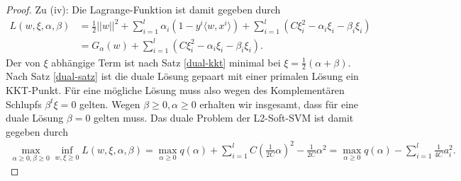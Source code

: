 \begin{proof}
Zu (iv): Die Lagrange-Funktion ist damit gegeben durch
$$
\begin{aligned}
L(w,\xi,\alpha,\beta) &= \frac{1}{2}||w||^2+\sum_{i=1}^l \alpha_i(1-y^i \langle w, x^i \rangle ) + \sum_{i= 1}^l \left(C \xi_i^2 - \alpha_i \xi_i - \beta_i \xi_i \right) \\
&= G_\alpha(w) + \sum_{i= 1}^l \left(C \xi_i^2 - \alpha_i \xi_i - \beta_i \xi_i \right).
\end{aligned}
$$
Der von $\xi$ abhängige Term ist nach Satz \ref{dual-kkt} minimal bei $\xi = \tfrac{1}{2}(\alpha + \beta)$. Nach Satz \ref{dual-satz} ist die duale Lösung gepaart mit einer primalen Lösung ein KKT-Punkt. Für eine mögliche Lösung muss also wegen des Komplementären Schlupfs $\beta^t \xi = 0$ gelten. Wegen $\beta \geq 0, \alpha \geq 0$ erhalten wir insgesamt, dass für eine duale Lösung $\beta  = 0$ gelten muss. Das duale Problem der L2-Soft-SVM ist damit gegeben durch
$$
\begin{aligned}
\max_{\alpha \geq 0, \beta \geq 0} \inf_{w,\xi \geq 0} L(w,\xi,\alpha,\beta) =
\max_{\alpha \geq 0} 
q(\alpha) + \sum_{i= 1}^l C(\tfrac{1}{2C}\alpha)^2 - \tfrac{1}{2C} \alpha^2 = 
\max_{\alpha \geq 0} q(\alpha) - \sum_{i= 1}^l \tfrac{1}{4C}a_i^2.
\end{aligned}
$$
\end{proof}

